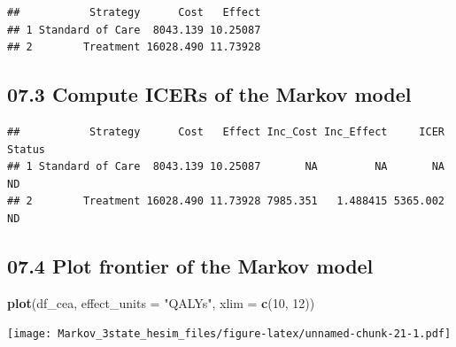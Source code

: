 \documentclass[
]{article}
\newenvironment{Shaded}{\begin{snugshade}}{\end{snugshade}}
\newcommand{\DataTypeTok}[1]{\textcolor[rgb]{0.13,0.29,0.53}{#1}}
\newcommand{\DecValTok}[1]{\textcolor[rgb]{0.00,0.00,0.81}{#1}}
\newcommand{\KeywordTok}[1]{\textcolor[rgb]{0.13,0.29,0.53}{\textbf{#1}}}
\newcommand{\NormalTok}[1]{#1}
\newcommand{\OperatorTok}[1]{\textcolor[rgb]{0.81,0.36,0.00}{\textbf{#1}}}
\newcommand{\StringTok}[1]{\textcolor[rgb]{0.31,0.60,0.02}{#1}}
\begin{document}
\begin{verbatim}
##           Strategy      Cost   Effect
## 1 Standard of Care  8043.139 10.25087
## 2        Treatment 16028.490 11.73928
\end{verbatim}

\hypertarget{compute-icers-of-the-markov-model}{%
\subsection{07.3 Compute ICERs of the Markov
model}\label{compute-icers-of-the-markov-model}}

\begin{Shaded}
\end{Shaded}

\begin{verbatim}
##           Strategy      Cost   Effect Inc_Cost Inc_Effect     ICER Status
## 1 Standard of Care  8043.139 10.25087       NA         NA       NA     ND
## 2        Treatment 16028.490 11.73928 7985.351   1.488415 5365.002     ND
\end{verbatim}

\hypertarget{plot-frontier-of-the-markov-model}{%
\subsection{07.4 Plot frontier of the Markov
model}\label{plot-frontier-of-the-markov-model}}

\begin{Shaded}
\begin{Highlighting}[]
\KeywordTok{plot}\NormalTok{(df_cea, }\DataTypeTok{effect_units =} \StringTok{"QALYs"}\NormalTok{, }\DataTypeTok{xlim =} \KeywordTok{c}\NormalTok{(}\DecValTok{10}\NormalTok{, }\DecValTok{12}\NormalTok{))}
\end{Highlighting}
\end{Shaded}

\texttt{[image: Markov\_3state\_hesim\_files/figure-latex/unnamed-chunk-21-1.pdf]}
\end{document}
